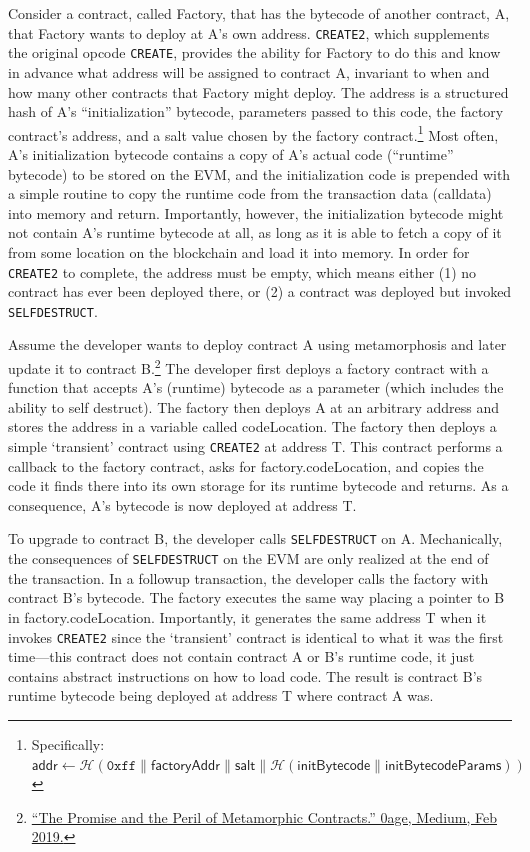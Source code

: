 Consider a contract, called Factory, that has the bytecode of another contract, A, that Factory wants to deploy at A's own address. \texttt{CREATE2}, which supplements the original opcode \texttt{CREATE}, provides the ability for Factory to do this and know in advance what address will be assigned to contract A, invariant to when and how many other contracts that Factory might deploy.  The address is a structured hash of A's ``initialization'' bytecode, parameters passed to this code, the factory contract's address, and a salt value chosen by the factory contract.\footnote{Specifically: $\mathsf{addr} \leftarrow \mathcal{H}(\mathtt{0xff} \| \mathsf{factoryAddr} \| \mathsf{salt} \| \mathcal{H} (\mathsf{initBytecode} \| \mathsf{initBytecodeParams}))$} Most often, A's initialization bytecode contains a copy of A's actual code (``runtime'' bytecode) to be stored on the EVM, and the initialization code is prepended with a simple routine to copy the runtime code from the transaction data (calldata) into memory and return. Importantly, however, the initialization bytecode might not contain A's runtime bytecode at all, as long as it is able to fetch a copy of it from some location on the blockchain and load it into memory. In order for \texttt{CREATE2} to complete, the address must be empty, which means either (1) no contract has ever been deployed there, or (2) a contract was deployed but invoked \texttt{SELFDESTRUCT}.

Assume the developer wants to deploy contract A using metamorphosis and later update it to contract B.\footnote{\href{https://medium.com/@0age/the-promise-and-the-peril-of-metamorphic-contracts-9eb8b8413c5e}{``The Promise and the Peril of Metamorphic Contracts.'' 0age, Medium, Feb 2019.}} The developer first deploys a factory contract with a function that accepts A's (runtime) bytecode as a parameter (which includes the ability to self destruct). The factory then deploys A at an arbitrary address and stores the address in a variable called codeLocation. The factory then deploys a simple `transient' contract using \texttt{CREATE2} at address T. This contract performs a callback to the factory contract, asks for factory.codeLocation, and copies the code it finds there into its own storage for its runtime bytecode and returns. As a consequence, A's bytecode is now deployed at address T. 

To upgrade to contract B, the developer calls \texttt{SELFDESTRUCT} on A. Mechanically, the consequences of \texttt{SELFDESTRUCT} on the EVM are only realized at the end of the transaction. In a followup transaction, the developer calls the factory with contract B's bytecode. The factory executes the same way placing a pointer to B in factory.codeLocation. Importantly, it generates the same address T when it invokes \texttt{CREATE2} since the `transient' contract is identical to what it was the first time---this contract does not contain contract A or B's runtime code, it just contains abstract instructions on how to load code. The result is contract B's runtime bytecode being deployed at address T where contract A was. 
  

